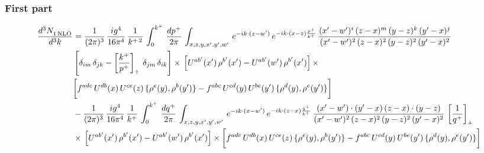 \documentclass[9pt]{article}
\numberwithin{equation}{section}
\begin{document}
\subsubsection*{First part}
\begin{align}
     \frac{d^{3}N_{1\,\rm NLO}^{\rm}}{d^{3}k}  & =  \frac{1}{(2\pi)^{3}}\, \frac{ig^{4}}{16\pi^{4}}\, \frac{1}{k^{+\,2}}\,\int_{0}^{k^{+}}\, \frac{dp^{+}}{2\pi}\,\int_{x,z,y,x',y',w'}\,e^{-ik\cdot (z-w^\prime)}\,e^{-ik\cdot (x-z)\frac{p^{+}}{k^{+}}}\,\frac{(x'-w')^{i}\,(z-x)^{m}\,(y-z)^{k}\,(y'-x)^{j}}{(x'-w')^{2}\,(z-x)^{2}\,(y-z)^{2}\,(y'-x)^{2}}\,\notag \\ & \left[\delta_{im}\,\delta_{jk}-\left[\frac{k^{+}}{p^{+}}\right]_{+}\, \delta_{jm}\,\delta_{ik}\right]\times\, \left[U^{ab'}(x')\,\rho^{b'}(x')-U^{ab'}(w')\,\rho^{b'}(x')\right]\times\notag \\ & \bigg[f^{adc}\,U^{db}(x)\,U^{ce}(z)\, \{\rho^{e}(y),\rho^{b}(y')\}-f^{abc}\,U^{cd}(y)\,U^{be}(y')\, \{\rho^{d}(y),\rho^{e}(y')\}\bigg] \notag \\ & -\frac{1}{(2\pi)^{3}}\, \frac{ig^{4}}{16\pi^{4}}\, \frac{1}{k^{+}}\,\int_{0}^{k^{+}}\, \frac{dq^{+}}{2\pi}\,\int_{x,z,y,x',y',w'}\,e^{-ik\cdot (x-w^\prime)}\,e^{-ik\cdot (z-x)\frac{q^{+}}{k^{+}}}\,\frac{(x'-w')\cdot (y'-x)\,(z-x)\cdot (y-z)}{(x'-w')^{2}\,(z-x)^{2}\,(y-z)^{2}\,(y'-x)^{2}}\,\left[\frac{1}{q^{+}}\right]_{+}\notag \\ & \times\, \left[U^{ab'}(x')\,\rho^{b'}(x')-U^{ab'}(w')\,\rho^{b'}(x')\right]\times \bigg[f^{adc}\,U^{db}(x)\,U^{ce}(z)\, \{\rho^{e}(y),\rho^{b}(y')\}-f^{abc}\,U^{cd}(y)\,U^{be}(y')\, \{\rho^{d}(y),\rho^{e}(y')\}\bigg]
\end{align}
\end{document}
